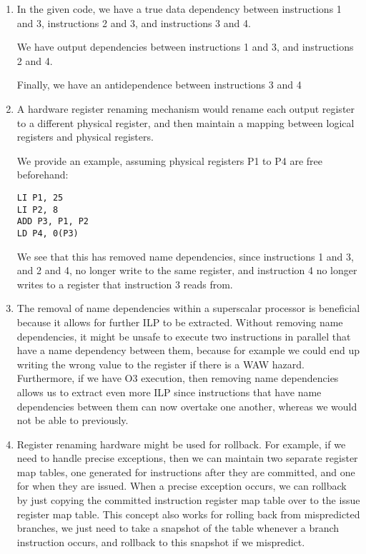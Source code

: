 


\begin{enumerate}[label=(\alph*)]
  \item
  In the given code, we have a true data dependency between instructions 1 and 3, instructions 2 and 3, and instructions 3 and 4.

  We have output dependencies between instructions 1 and 3, and instructions 2 and 4.

  Finally, we have an antidependence between instructions 3 and 4

\item
  A hardware register renaming mechanism would rename each output register to a different physical register, and then maintain a mapping between logical registers and physical registers.

  We provide an example, assuming physical registers P1 to P4 are free beforehand:

\begin{verbatim}
LI P1, 25
LI P2, 8
ADD P3, P1, P2
LD P4, 0(P3)
\end{verbatim}

  We see that this has removed name dependencies, since instructions 1 and 3, and 2 and 4, no longer write to the same register, and instruction 4 no longer writes to a register that instruction 3 reads from.

\item
  The removal of name dependencies within a superscalar processor is beneficial because it allows for further ILP to be extracted. Without removing name dependencies, it might be unsafe to execute two instructions in parallel that have a name dependency between them, because for example we could end up writing the wrong value to the register if there is a WAW hazard. Furthermore, if we have O3 execution, then removing name dependencies allows us to extract even more ILP since instructions that have name dependencies between them can now overtake one another, whereas we would not be able to previously.

\item
  Register renaming hardware might be used for rollback. For example, if we need to handle precise exceptions, then we can maintain two separate register map tables, one generated for instructions after they are committed, and one for when they are issued. When a precise exception occurs, we can rollback by just copying the committed instruction register map table over to the issue register map table. This concept also works for rolling back from mispredicted branches, we just need to take a snapshot of the table whenever a branch instruction occurs, and rollback to this snapshot if we mispredict.


\end{enumerate}

